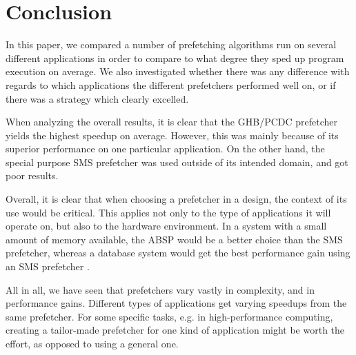 
\section{Conclusion}
\label{sec:conclusion}

In this paper, we compared a number of prefetching algorithms run on
several different applications in order to compare to what degree they
sped up program execution on average. We also investigated whether
there was any difference with regards to which applications the
different prefetchers performed well on, or if there was a strategy
which clearly excelled.

When analyzing the overall results, it is clear that the GHB/PCDC prefetcher yields the highest speedup on average. However, this was mainly because of its superior performance on one particular application. On the other hand, the special purpose SMS prefetcher was used outside of its intended domain, and got poor results.  

Overall, it is clear that when choosing a prefetcher in a design, the context of its use would be critical. This applies not only to the type of applications it will operate on, but also to the hardware environment. In a system with a small amount of memory available, the ABSP would be a better choice than the SMS prefetcher, whereas a database system would get the best performance gain using an SMS prefetcher \cite{SMS}. 

All in all, we have seen that prefetchers vary vastly in complexity, and in performance gains. Different types of applications get varying speedups from the same prefetcher. For some specific tasks, e.g. in high-performance computing, creating a tailor-made prefetcher for one kind of application might be worth the effort, as opposed to using a general one.
